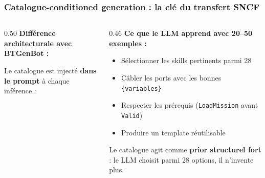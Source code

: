 \documentclass[aspectratio=169]{beamer}
\begin{document}
\begin{frame}
  \frametitle{Catalogue-conditioned generation : la clé du transfert SNCF}

  \begin{columns}
    \begin{column}{0.50\textwidth}
      \textbf{Différence architecturale avec BTGenBot :}

      \vspace{0.5em}
      Le catalogue est injecté \textbf{dans le prompt} à chaque inférence :

      \vspace{0.3em}
    \end{column}
    \begin{column}{0.46\textwidth}
      \textbf{\small Ce que le LLM apprend avec 20–50 exemples :}
      {\small\begin{itemize}
        \item Sélectionner les skills pertinents parmi 28
        \item Câbler les ports avec les bonnes \texttt{\{variables\}}
        \item Respecter les prérequis (\texttt{LoadMission} avant \texttt{Valid})
        \item Produire un template réutilisable
      \end{itemize}}

      \vspace{0.2em}
      \begin{block}{}
        \small Le catalogue agit comme \textbf{prior structurel fort} :
        le LLM choisit parmi 28 options, il n'invente plus.
      \end{block}
    \end{column}
  \end{columns}
\end{frame}
\end{document}
